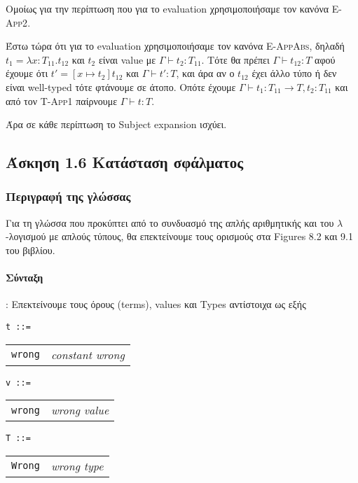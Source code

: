 \documentclass[a4paper,11pt]{article}
\begin{document}
Ομοίως για την περίπτωση που για το evaluation χρησιμοποιήσαμε τον κανόνα \textsc{E-App2}.

Έστω τώρα ότι για το evaluation χρησιμοποιήσαμε τον κανόνα \textsc{E-AppAbs}, δηλαδή $t_1 = \lambda x:T_{11}.t_{12}$ και $t_2$ είναι value με $\Gamma \vdash t_2:T_{11}$.
Τότε θα πρέπει $\Gamma \vdash t_{12}:T$ αφού έχουμε ότι $t' = [x \mapsto t_2]t_{12}$ και $\Gamma \vdash t':T$, και άρα αν ο $t_{12}$ έχει άλλο τύπο ή δεν είναι well-typed τότε φτάνουμε σε άτοπο. Οπότε έχουμε $\Gamma \vdash t_1:T_{11} \rightarrow T, t_2:T_{11}$ και από τον \textsc{T-App1} παίρνουμε $\Gamma \vdash t:T$.

\vspace{5mm}

Άρα σε κάθε περίπτωση το Subject expansion ισχύει.

\subsection*{Άσκηση 1.6 Κατάσταση σφάλματος}

\subsubsection*{Περιγραφή της γλώσσας}
Για τη γλώσσα που προκύπτει από το συνδυασμό της απλής αριθμητικής και του $\lambda$-λογισμού με απλούς τύπους, θα επεκτείνουμε τους ορισμούς στα Figures 8.2 και 9.1 του βιβλίου.

\pagebreak

\paragraph*{Σύνταξη}:
Επεκτείνουμε τους όρους (terms), values και Types αντίστοιχα ως εξής

\verb|t ::=|

\begin{tabular}{l r}
  \verb|wrong| & \textit{constant wrong}
\end{tabular}

\verb|v ::=|

\begin{tabular}{l r}
  \verb|wrong| & \textit{wrong value}
\end{tabular}

\verb|Τ ::=|

\begin{tabular}{l r}
  \verb|Wrong| & \textit{wrong type}
\end{tabular}
\end{document}
